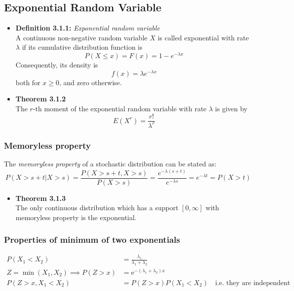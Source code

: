\documentclass[11pt,a4paper]{article}
\begin{document}
\subsection{Exponential Random Variable}

\begin{itemize}
    \item \textbf{Definition 3.1.1:} \emph{Exponential random variable} \\
        A continuous non-negative random variable $X$ is called exponential with rate $\lambda$
        if its cumulative distribution function is
        \[
            P(X \leq x) = F(x) = 1 - e ^{-\lambda x}
        \]
        Consequently, its density is
        \[
            f(x) = \lambda e^{-\lambda x}
        \]
        both for $x \geq 0$, and zero otherwise.
    \item \textbf{Theorem 3.1.2} \\
        The $r$-th moment of the exponential random variable with rate $\lambda$ is given by
        \[
            E(X^r) = \frac{r!}{\lambda^r}
        \]
\end{itemize}

\subsubsection{Memoryless property}
The \emph{memoryless property} of a stochastic distribution can be stated as:
\[
    P(X>s+t|X>s) = \frac{P(X>s + t, X>s)}{P(X>s)} = \frac{e^{-\lambda (s+t)}}{e^{-\lambda s}}
    = e^{-\lambda t} = P(X>t)
\]
\begin{itemize}

    \item \textbf{Theorem 3.1.3} \\
        The only continuous distribution which has a support $[{0,\infty}]$
        with memoryless property is the exponential.

\end{itemize}

\subsubsection{Properties of minimum of two exponentials}
\begin{align*}{}
    P(X_1 < X_2) &= \frac{\lambda_1}{\lambda_1 + \lambda_2} \\
    Z = \min(X_1, X_2) \implies
    P(Z>x) &= \mathrm{e}^{-(\lambda_1 + \lambda_2)x} \\
    P(Z > x, X_1 < X_2) &= P(Z>x) P(X_1 < X_2) \quad \text{i.e.\ they are independent}
\end{align*}
\end{document}
